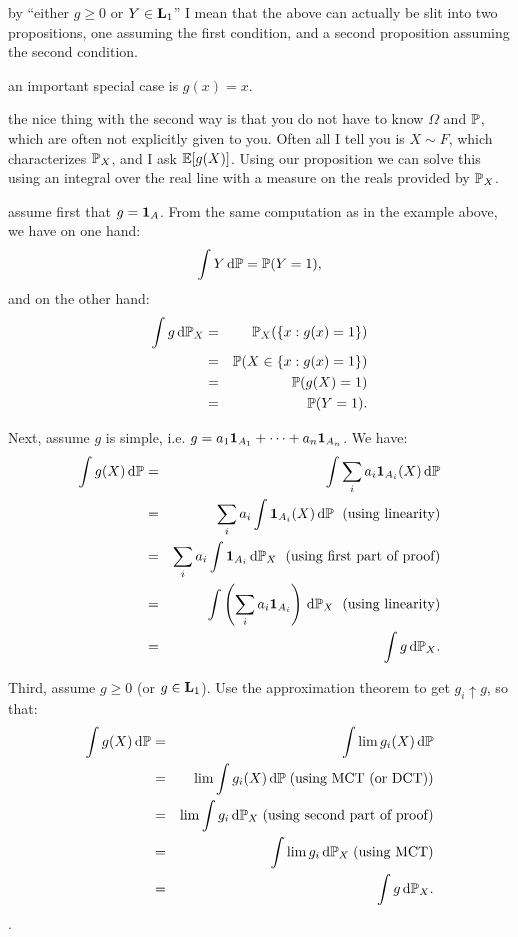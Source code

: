 \documentclass{article}
\begin{document}
 by ``either $g \ge 0$ or $Y \in \L_1$'' I mean that the above can actually be slit into two propositions, one assuming the first condition, and a second proposition assuming the second condition.

 an important special case is $g(x) = x$.

 the nice thing with the second way is that you do not have to know $\Omega$ and $\P$, which are often not explicitly given to you. Often all I tell you is $X \sim F$, which characterizes $\P_X$, and I ask $\E[g(X)]$. Using our proposition we can solve this using an integral over the real line with a measure on the reals provided by $\P_X$.

 assume first that $g = \1_A$. From the same computation as in the example above, we have on one hand:
\[ \int Y \ud \P = \P(Y = 1), \]
and on the other hand:
\begin{eqnarray*} 
\int g \ud \P_X &=&  \P_X(\{x : g(x) = 1\}) \\
&=& \P(X \in \{x : g(x) = 1\}) \\
&=& \P(g(X) = 1) \\
&=& \P(Y = 1).
\end{eqnarray*}

\noindent Next, assume $g$ is simple, i.e. $g = a_1 \1_{A_1} + \dots + a_n \1_{A_n}$. We have:
\begin{eqnarray*}
\int g(X) \ud \P &=& \int \sum_i a_i \1_{A_i}(X) \ud \P \\
&=& \sum_i a_i \int \1_{A_i}(X) \ud \P \;\text{ (using linearity)} \\
&=& \sum_i a_i \int \1_{A_i} \ud \P_X \;\text{ (using first part of proof)}\\
&=& \int \left(\sum_i a_i \1_{A_i}\right) \ud \P_X\;\text{ (using linearity)} \\
&=& \int g \ud \P_X.
\end{eqnarray*}

\noindent Third, assume $g \ge 0$ (or $g\in \L_1$). Use the approximation theorem to get $g_i \uparrow g$, so that:
\begin{eqnarray*}
\int g(X) \ud \P &=& \int \lim g_i(X) \ud \P \\
&=& \lim \int g_i(X) \ud \P \;\text{(using MCT (or DCT))} \\
&=& \lim \int g_i \ud \P_X \;\text{(using second part of proof)} \\
&=& \int \lim g_i \ud \P_X \;\text{(using MCT)} \\
&=& \int g \ud \P_X.
\end{eqnarray*}.
\end{document}
